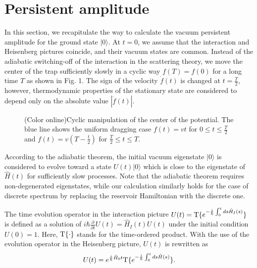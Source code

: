 \documentclass[aps,pre,twocolumn,eqsecnum,showpacs,superscriptaddress]{revtex4}
\begin{document}
\section{Persistent amplitude} 
In this section, we recapitulate the way to calculate the vacuum persistent amplitude for the ground state $|0\rangle$. At $t=0$, we assume that the interaction and Heisenberg pictures coincide, and their vacuum states are common. %
Instead of the adiabatic switching-off of the interaction in the scattering theory, we move the center of the trap sufficiently slowly in a cyclic way $f(T)=f(0)$ for a long time $T$ as shown in Fig. 1. The sign of the velocity $\dot{f}(t)$ is changed at $t=\frac{T}{2}$, however, thermodynamic properties of the stationary state are considered to depend only on the absolute value $|\dot{f}(t)|$.      
\begin{figure}
\caption{(Color online)Cyclic manipulation of the center of the potential. The blue line shows the uniform dragging case $f(t)=v t$ for $0\leq t\leq\frac{T}{2}$ and $f(t)=v(T-\frac{t}{2})$ for $\frac{T}{2}\leq t\leq T$.}%
\end{figure}  
According to the adiabatic theorem\cite{Thirring1}, the initial vacuum eigenstate $|0\rangle$ is considered to evolve toward a state $U(t)|0\rangle$ which is close to the eigenstate of $\hat{H}(t)$ for sufficiently slow processes. Note that the adiabatic theorem requires non-degenerated eigenstates, while our calculation similarly holds for the case of discrete spectrum by replacing the reservoir Hamiltonian with the discrete one.   

The time evolution operator in the interaction picture $U(t)={\rm T}\{e^{-\frac{i}{\hbar}\int_0^t ds \hat{H}_I(s)}\}$ is defined as a solution of $i\hbar\frac{\partial}{\partial t}U(t)=\hat{H}_I(t)U(t)$ under the initial condition $U(0)=1$. Here, ${\rm T}\{\cdot\}$ stands for the time-ordered product.
With the use of the evolution operator in the Heisenberg picture, $U(t)$ is rewritten as 
\begin{equation}
U(t)=e^{\frac{i}{\hbar}\hat{H}_0 t}{\rm T}\{e^{-\frac{i}{\hbar}\int_0^t ds \hat{H}(s)}\}.  \label{unitary1}
\end{equation}  
\end{document}
